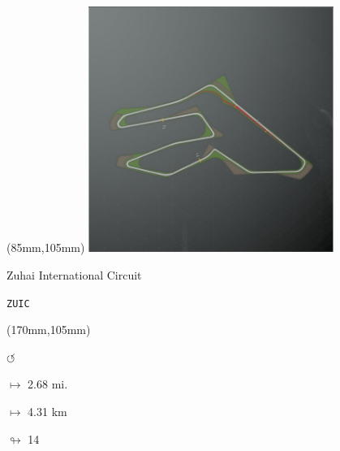 \begin{textblock*}{80mm}(85mm,105mm)%
\includegraphics[width=80mm]{TR/2015-05-20_00070.png}
\centerline{Zuhai International Circuit}
\par\hfill\tiny\tt ZUIC\\
\end{textblock*}
\begin{textblock*}{30mm}(170mm,105mm)%
\par \Huge$\circlearrowleft$
\Large
\par$\mapsto$ 2.68 mi.
\par$\mapsto$ 4.31 km
\par$\looparrowright$ 14
\end{textblock*}
